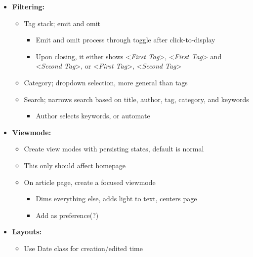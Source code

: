 \documentclass[7px]{article}
\begin{document}
{
  \begin{itemize}[label=\textsection]
    \item {\textbf{Filtering:}}
      \small
      \begin{itemize}[label=$\multimapdotinv$, leftmargin=3mm]
        \item Tag stack; emit and omit
          \begin{itemize}[label=\wr, leftmargin=1.7mm]
            \item Emit and omit process through toggle after click-to-display
            \item Upon closing, it either shows <\textsl{First Tag}>, <\textsl{First Tag}> and <\textsl{Second Tag}>, or <\textsl{First Tag}>, <\textsl{Second Tag}>\textellipsis
          \end{itemize}
        \item Category; dropdown selection, more general than tags
        \item Search; narrows search based on title, author, tag, category, and keywords
          \begin{itemize}[label=\wr, leftmargin=1.7mm]
            \item Author selects keywords, or automate
          \end{itemize}
      \end{itemize}
      \normalsize
    \item \textbf{Viewmode:}
      \small 
      \begin{itemize}[label=$\multimapdotinv$, leftmargin=3mm]
        \item Create view modes with persisting states, default is normal 
        \item This only should affect homepage
        \item On article page, create a focused viewmode
          \begin{itemize}[label=\wr, leftmargin=1.7mm]
            \item Dims everything else, adds light to text, centers page
            \item Add as preference(?)
          \end{itemize}
      \end{itemize}
      \normalsize
    \item \textbf{Layouts: }
      \small
      \begin{itemize}[label=$\multimapdotinv$, leftmargin=3mm]
        \item Use Date class for creation/edited time

\end{itemize}
\end{itemize}}
\end{document}
